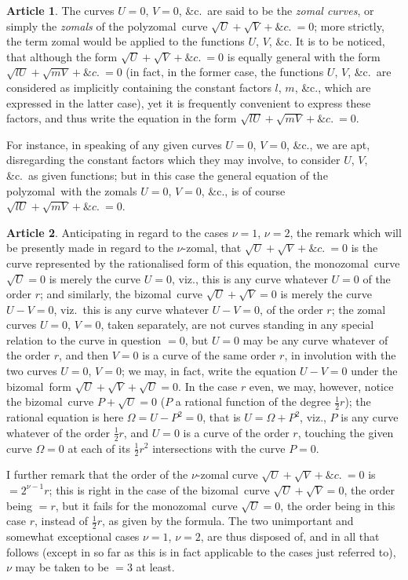 \documentclass[11pt,a4paper]{article}
\theoremstyle{definition}
\newtheorem{art}{Article}
\newcommand{\polyzomal}{polyzomal}
\newcommand{\bizomal}{bizomal}
\newcommand{\monozomal}{monozomal}
\begin{document}
\begin{art}
The curves $U = 0$, $V = 0$, \&c.\ are said to be the \textit{zomal curves}, or simply the \textit{zomals} of the \polyzomal\ curve $\sqrt{U} + \sqrt{V} + \&c.\ = 0$; more strictly, the term zomal would be applied to the functions $U$, $V$, \&c. It is to be noticed, that although the form $\sqrt{U} + \sqrt{V} + \&c.\ = 0$ is equally general with the form $\sqrt{lU} + \sqrt{mV} + \&c.\ = 0$ (in fact, in the former case, the functions $U$, $V$, \&c.\ are considered as implicitly containing the constant factors $l$, $m$, \&c., which are expressed in the latter case), yet it is frequently convenient to express these factors, and thus write the equation in the form $\sqrt{lU} + \sqrt{mV} + \&c.\ = 0$.

For instance, in speaking of any given curves $U = 0$, $V = 0$, \&c., we are apt, disregarding the constant factors which they may involve, to consider $U$, $V$, \&c.\ as given functions; but in this case the general equation of the \polyzomal\ with the zomals $U = 0$, $V = 0$, \&c., is of course $\sqrt{lU} + \sqrt{mV} + \&c.\ = 0$.
\end{art}

\begin{art}
Anticipating in regard to the cases $\nu = 1$, $\nu = 2$, the remark which will be presently made in regard to the $\nu$-zomal, that $\sqrt{U} + \sqrt{V} + \&c.\ = 0$ is the curve represented by the rationalised form of this equation, the \monozomal\ curve $\sqrt{U} = 0$ is merely the curve $U = 0$, viz., this is any curve whatever $U = 0$ of the order $r$; and similarly, the \bizomal\ curve $\sqrt{U} + \sqrt{V} = 0$ is merely the curve $U - V = 0$, viz.\ this is any curve whatever $U - V = 0$, of the order $r$; the zomal curves $U = 0$, $V = 0$, taken separately, are not curves standing in any special relation to the curve in question $= 0$, but $U = 0$ may be any curve whatever of the order $r$, and then $V = 0$ is a curve of the same order $r$, in involution with the two curves $U = 0$, $V = 0$; we may, in fact, write the equation $U - V = 0$ under the \bizomal\ form $\sqrt{U} + \sqrt{V} + \sqrt{U} = 0$. In the case $r$ even, we may, however, notice the \bizomal\ curve $P + \sqrt{U} = 0$ ($P$ a rational function of the degree $\tfrac{1}{2}r$); the rational equation is here $\Omega = U - P^{2} = 0$, that is $U = \Omega + P^{2}$, viz., $P$ is any curve whatever of the order $\tfrac{1}{2}r$, and $U = 0$ is a curve of the order $r$, touching the given curve $\Omega = 0$ at each of its $\tfrac{1}{2}r^{2}$ intersections with the curve $P = 0$.

I further remark that the order of the $\nu$-zomal curve $\sqrt{U} + \sqrt{V} + \&c.\ = 0$ is $= 2^{\nu-1}r$; this is right in the case of the \bizomal\ curve $\sqrt{U} + \sqrt{V} = 0$, the order being $= r$, but it fails for the \monozomal\ curve $\sqrt{U} = 0$, the order being in this case $r$, instead of $\tfrac{1}{2}r$, as given by the formula. The two unimportant and somewhat exceptional cases $\nu = 1$, $\nu = 2$, are thus disposed of, and in all that follows (except in so far as this is in fact applicable to the cases just referred to), $\nu$ may be taken to be $= 3$ at least.
\end{art}
\end{document}
